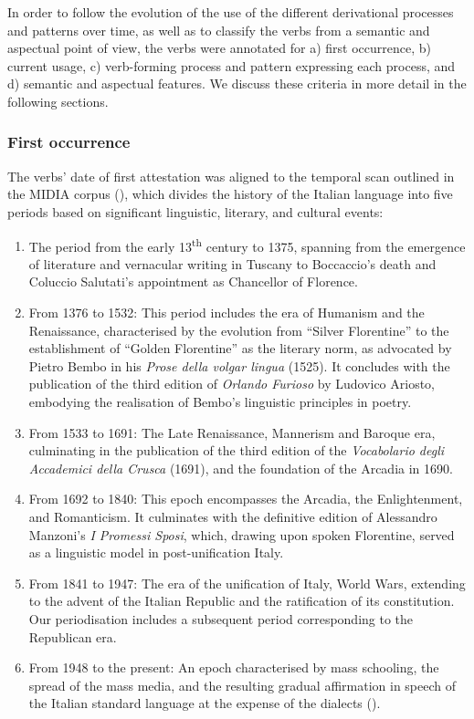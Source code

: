 \documentclass[output=paper,colorlinks,citecolor=brown]{langscibook}
\begin{document}
In order to follow the evolution of the use of the different derivational processes and patterns over time, as well as to classify the verbs from a semantic and aspectual point of view, the verbs were annotated for a) first occurrence, b) current usage, c) verb-forming process and pattern expressing each process, and d) semantic and aspectual features. We discuss these criteria in more detail in the following sections.


 \subsubsection{First occurrence}     
The verbs’ date of first attestation was aligned to the temporal scan outlined in the MIDIA corpus (\citealt{DAchille2017}), which divides the history of the Italian language into five periods based on significant linguistic, literary, and cultural events:
    
\begin{enumerate}
        \item The period from the early 13\textsuperscript{th} century to 1375, spanning from the emergence of literature and vernacular writing in Tuscany to Boccaccio’s death and Coluccio Salutati’s appointment as Chancellor of Florence. \item From 1376 to 1532: This period includes the era of Humanism and the Renaissance, characterised by the evolution from “Silver Florentine” to the establishment of “Golden Florentine” as the literary norm, as advocated by Pietro Bembo in his \textit{Prose della volgar lingua} (1525). It concludes with the publication of the third edition of \textit{Orlando Furioso} by Ludovico Ariosto, embodying the realisation of Bembo’s linguistic principles in poetry. 
        \item From 1533 to 1691: The Late Renaissance, Mannerism and Baroque era, culminating in the publication of the third edition of the \textit{Vocabolario degli Accademici della Crusca} (1691), and the foundation of the Arcadia in 1690. 
        \item From 1692 to 1840: This epoch encompasses the Arcadia, the Enlightenment, and Romanticism. It culminates with the definitive edition of Alessandro Manzoni’s \textit{I Promessi Sposi}, which, drawing upon spoken Florentine, served as a linguistic model in post-unification Italy. 
        \item From 1841 to 1947: The era of the unification of Italy, World Wars, extending to the advent of the Italian Republic and the ratification of its constitution. \\Our periodisation includes a subsequent period corresponding to the Republican era. 
        \item From 1948 to the present: An epoch characterised by mass schooling, the spread of the mass media, and the resulting gradual affirmation in speech of the Italian standard language at the expense of the dialects (\citealt{DeMauro2014}).
    \end{enumerate}
\end{document}
